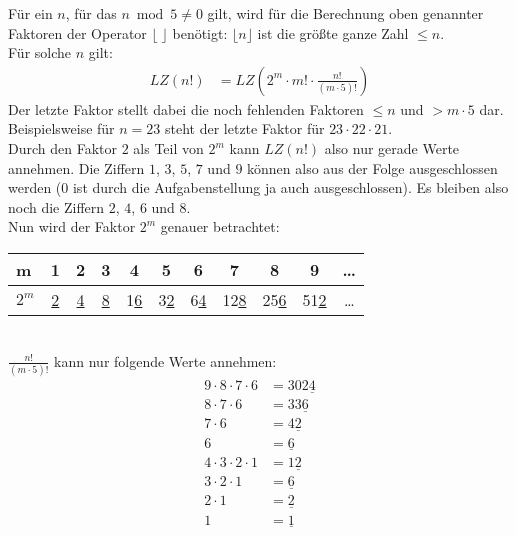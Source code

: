 \documentclass[12pt,a4paper,oneside]{article}
\begin{document}
Für ein $n$, für das $n\bmod 5 \neq 0$ gilt, wird für die Berechnung oben genannter Faktoren der Operator $\lfloor\;\rfloor$ benötigt: $\lfloor n \rfloor$ ist die größte ganze Zahl $\leq n$. \\[10pt]
Für solche $n$ gilt:
\begin{equation*}
	\begin{split}
		LZ(n!) &= LZ\left(2^m \cdot m! \cdot \frac{n!}{(m\cdot5)!} \right)
	\end{split}
\end{equation*}
Der letzte Faktor stellt dabei die noch fehlenden Faktoren $\leq n$ und $> m\cdot5$ dar. Beispielsweise für $n=23$ steht der letzte Faktor für $23\cdot22\cdot21$. \\[10pt]
Durch den Faktor $2$ als Teil von $2^m$ kann $LZ(n!)$ also nur gerade Werte annehmen. Die Ziffern $1$, $3$, $5$, $7$ und $9$ können also aus der Folge ausgeschlossen werden ($0$ ist durch die Aufgabenstellung ja auch ausgeschlossen). Es bleiben also noch die Ziffern $2$, $4$, $6$ und $8$. \\[10pt]
Nun wird der Faktor $2^m$ genauer betrachtet:
\begin{table}[h!]
	\hspace{0.5cm}\begin{tabular}{l|c|c|c|c|c|c|c|c|c|c}
		m & 1 & 2 & 3 & 4 & 5 & 6 & 7 & 8 & 9 & \dots \\
		\hline
		$2^m$ & \underline{2} & \underline{4} & \underline{8} & 1\underline{6} & 3\underline{2} & 6\underline{4} & 12\underline{8} & 25\underline{6} & 51\underline{2} & \dots \\
	\end{tabular}
\end{table}
\\
$\frac{n!}{(m\cdot5)!}$ kann nur folgende Werte annehmen:
\begin{equation*}
	\begin{split}
		9\cdot8\cdot7\cdot6 &= 302\underline{4} \\
		8\cdot7\cdot6 &= 33\underline{6} \\
		7\cdot6 &= 4\underline{2} \\
		6 &= \underline{6} \\
		4\cdot3\cdot2\cdot1 &= 1\underline{2} \\
		3\cdot2\cdot1 &= \underline{6} \\
		2\cdot1 &= \underline{2} \\
		1 &= \underline{1}
	\end{split}
\end{equation*}
\end{document}
